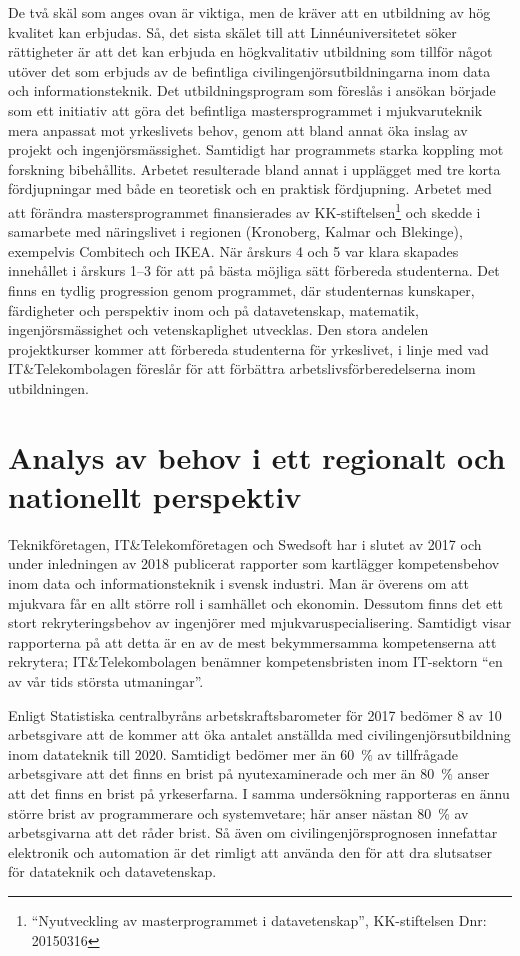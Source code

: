 De två skäl som anges ovan är viktiga, men de kräver att en utbildning av hög kvalitet kan erbjudas. Så, det sista skälet till att Linnéuniversitetet söker rättigheter är att det kan erbjuda en högkvalitativ utbildning som tillför något utöver det som erbjuds av de befintliga civilingenjörsutbildningarna inom data och informationsteknik. Det utbildningsprogram som föreslås i ansökan började som ett initiativ att göra det befintliga mastersprogrammet i mjukvaruteknik mera anpassat mot yrkeslivets behov, genom att bland annat öka inslag av projekt och ingenjörsmässighet. Samtidigt har programmets starka koppling mot forskning bibehållits. Arbetet resulterade bland annat i upplägget med tre korta fördjupningar med både en teoretisk och en praktisk fördjupning. Arbetet med att förändra mastersprogrammet finansierades av KK-stiftelsen\footnote{``Nyutveckling av masterprogrammet i datavetenskap'', KK-stiftelsen Dnr: 20150316} och skedde i samarbete med näringslivet i regionen (Kronoberg, Kalmar och Blekinge), exempelvis Combitech och IKEA. När årskurs 4 och 5 var klara skapades innehållet i årskurs 1–3 för att på bästa möjliga sätt förbereda studenterna. Det finns en tydlig progression genom programmet, där studenternas kunskaper, färdigheter och perspektiv inom och på datavetenskap, matematik, ingenjörsmässighet och vetenskaplighet utvecklas. Den stora andelen projektkurser kommer att förbereda studenterna för yrkeslivet, i linje med vad IT\&Telekombolagen föreslår för att förbättra arbetslivsförberedelserna inom utbildningen.

\section{Analys av behov i ett regionalt och nationellt perspektiv}\label{sec:analysindbehov}

Teknikföretagen, IT\&Telekomföretagen och Swedsoft har i slutet av 2017 och under inledningen av 2018 publicerat rapporter som kartlägger kompetensbehov inom data och informationsteknik i svensk industri. Man är överens om att mjukvara får en allt större roll i samhället och ekonomin. Dessutom finns det ett stort rekryteringsbehov av ingenjörer med mjukvaruspecialisering. Samtidigt visar rapporterna på att detta är en av de mest bekymmersamma kompetenserna att rekrytera; IT\&Telekombolagen benämner kompetensbristen inom IT-sektorn ``en av vår tids största utmaningar''.

Enligt Statistiska centralbyråns arbetskraftsbarometer för 2017 bedömer 8 av 10 arbetsgivare att de kommer att öka antalet anställda med civilingenjörsutbildning inom datateknik till 2020. Samtidigt bedömer mer än 60~\% av tillfrågade arbetsgivare att det finns en brist på nyutexaminerade och mer än 80~\% anser att det finns en brist på yrkeserfarna. I samma undersökning rapporteras en ännu större brist av programmerare och systemvetare; här anser nästan 80~\% av arbetsgivarna att det råder brist. Så även om civilingenjörsprognosen innefattar elektronik och automation är det rimligt att använda den för att dra slutsatser för datateknik och datavetenskap.

